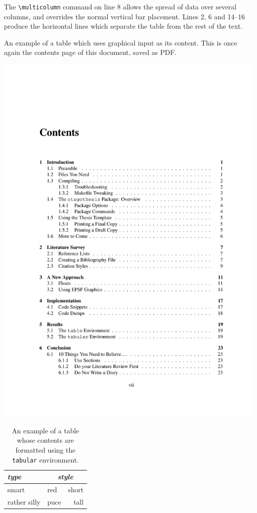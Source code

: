 The \verb|\multicolumn| command on line 8 allows the spread of data
over several columns, and overrides the normal vertical bar placement.
Lines 2, 6 and 14--16 produce the horizontal lines which separate
the table from the rest of the text.

\begin{table}
\hrulefill
\caption[A table with graphical input]{An example of a table which
uses graphical input as its content.  This is once again the
contents page of this document, saved as PDF.}
\label{tab:ex1}
\hrulefill
\begin{center}
\includegraphics[scale = 0.5, angle = 270]{page.pdf}
\end{center}
\par
\bigskip
\hrulefill
\end{table}


\begin{table}
\hrulefill
\caption[A tabular table]{An example of a table whose contents are
formatted using the {\tt tabular} environment.}
\label{tab:ex2}
\hrulefill
\begin{center}
\begin{tabular}{|l|l|r|}
\hline\hline
{\em type} & \multicolumn{2}{c|}{\em style} \\ \hline
smart & red & short \\
rather silly & puce & tall \\ \hline\hline
\end{tabular}
\par
\bigskip
\hrulefill
\end{center}
\end{table}
